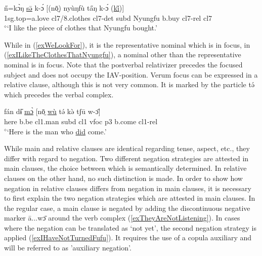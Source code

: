 \documentclass[10pt,twoside]{article}
\def\ci#1{{\ipaFont #1}}
\newcommand{\gl}[1]{`#1'}
\def\VSP{\vspace{0pt}}
\newcommand{\cl}[1]{{\sc cl#1}}
\newcommand{\pref}[1]{(\ref{#1})}
\def\elicited{$^\diamond$}
\begin{document}
\begin{exe}
	\ex \label{exILikeTheClothes}	

		\gll n̋=kɔ̀ŋ \uline{sə̄} k-ɔ́ [(nō̤) nyùŋfù ta̋ŋ k-ɔ́ (\uline{ki̋})]			\\
		{\sc 1sg.top}=a.love \cl7/8.clothes \cl7-{\sc det} {\sc subd} Nyungfu b.buy \cl7-{\sc rel} \cl7 	\\
		\glt \VSP \elicited \gl{I like the piece of clothes that Nyungfu bought.}

\end{exe}%

While in \pref{exWeLookFor}, it is the representative nominal which is in focus, in \pref{exILikeTheClothesThatNyungfu}, 
a nominal other than the representative nominal is in focus. Note that the postverbal relativizer precedes 
the focused subject and does not occupy the IAV-position.
Verum focus can be expressed in a relative clause, although this is not very common. It is 
marked by the particle \ci{tə́} which precedes the verbal complex.

\begin{exe}
	\ex \label{exWeLookFor}	

		\gll 	fán dɨ̋ \uline{mɔ̀} [nō̤ \uline{wù} tə́ kə̀ tʃū w-ɔ̄]	\\
			here b.be \cl1.man {\sc subd} \cl1  {\sc vfoc} {\sc p3} b.come \cl1-{\sc rel}\\
		\glt \VSP \elicited \gl{Here is the man who \uline{did} come.}
		
\end{exe}%

While main and relative clauses are identical regarding tense, aspect, etc., they differ with regard to negation. Two different negation strategies are attested in main clauses, the choice between which is semantically determined. In relative clauses on the other hand, no such distinction is made. In order to show how negation in relative clauses differs from negation in main clauses, it is necessary to first explain the two negation strategies which are attested in main clauses.
In the regular case, a main clause is negated by adding the discontinuous negative marker \ci{ā...wɔ̄} 
around the verb complex %
\pref{exTheyAreNotListening}. In cases where the negation can be translated as \gl{not yet}, the second negation strategy is applied \pref{exIHaveNotTurnedFufu}. It requires the use of a copula auxiliary and will be referred to as 'auxiliary negation'.
\end{document}

